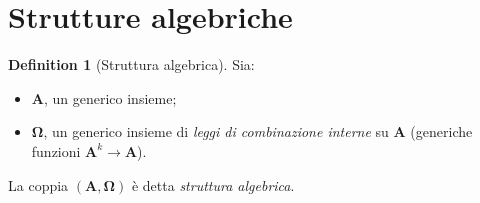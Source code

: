 \documentclass[12pt, a4paper]{report}
\theoremstyle{definition}
\newtheorem{definition}{Definition}[section]
\begin{document}
		\section{Strutture algebriche \cite{2} \cite{3}}
			\begin{definition}[Struttura algebrica]
				Sia:
				\begin{itemize}
					\item $\mathbf{A}$, un generico insieme;
					\item $\mathbf{\Omega}$, un generico insieme di \emph{leggi di combinazione interne} su $\mathbf{A}$ (generiche funzioni $\mathbf{A}^k\rightarrow \mathbf{A}$).
				\end{itemize}
				\begin{center}
					La coppia $(\mathbf{A},\mathbf{\Omega})$ è detta \emph{struttura algebrica}.
				\end{center}
			\end{definition}
\end{document}
